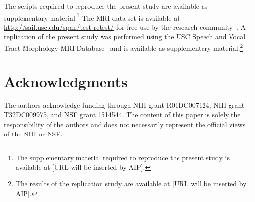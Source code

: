 \documentclass[preprint]{JASAnew}\usepackage[]{graphicx}\usepackage[]{color}
\begin{document}
The scripts required to reproduce the present study are available as supplementary material.\footnote{The supplementary material required to reproduce the present study is available at [URL will be inserted by AIP].}
%
The MRI data-set is available at \url{http://sail.usc.edu/span/test-retest/} for free use by the research community~\citep[see][]{toger2017test}.
%
A replication of the present study was performed using the USC Speech and Vocal Tract Morphology MRI Database~\citep{sorensen2017database} and is available as supplementary material.\footnote{The results of the replication study are available at [URL will be inserted by AIP].}

\section{Acknowledgments} 

The authors acknowledge funding through NIH grant R01DC007124, NIH grant T32DC009975, and NSF grant 1514544. The content of this paper is solely the responsibility of the authors and does not necessarily represent the official views of the NIH or NSF.


\end{document}
